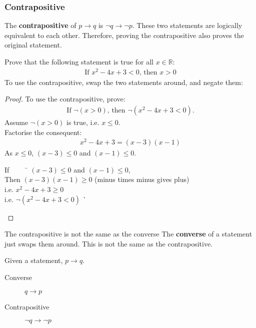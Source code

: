 \documentclass[../notes.tex]{subfiles}
\begin{document}
				\subsubsection{Contrapositive}
					The \textbf{contrapositive} of $p \rightarrow q$ is $\lnot q \rightarrow \lnot p$. These two statements are logically equivalent to each other. Therefore, proving the contrapositive also proves the original statement.
				\begin{example}
					Prove that the following statement is true for all $x \in \mathbb{R}$:
					\begin{align*}
						\text{If } x^{2} - 4x + 3 < 0 \text{, then } x > 0
					\end{align*}
					To use the contrapositive, swap the two statements around, and negate them:
					\begin{proof}
						To use the contrapositive, prove:
						\begin{align*}
							\text{If } \lnot(x > 0) \text{, then } \lnot(x^{2} - 4x + 3 < 0).
						\end{align*}
						Assume $\lnot (x > 0)$ is true, i.e. $x \leq 0$.\\
						Factorise the consequent:
						\begin{align*}
							x^{2} - 4x + 3 = (x - 3)(x - 1)
						\end{align*}
						As $x \leq 0$, $(x - 3) \leq 0$ and $(x - 1) \leq 0$.
						\begin{tabbing}
							If $\qquad$ \= $(x - 3) \leq 0$ and $(x - 1) \leq 0$,\\
							Then \> $(x - 3)(x - 1) \geq 0$ (minus times minus gives plus)\\
							i.e. \> $x^{2} - 4x + 3 \geq 0$\\
							i.e. \> $\lnot (x^{2} - 4x + 3 < 0)$ \` \qedhere
						\end{tabbing}
					\end{proof}
				\end{example}
				\begin{sidenote}{The contrapositive is not the same as the converse}
					The \textbf{converse} of a statement just swaps them around. This is not the same as the contrapositive.
					\begin{example}
						Given a statement, $p \rightarrow q$.
						\begin{description}
							\item[Converse] $q \rightarrow p$
							\item[Contrapositive] $\lnot q \rightarrow \lnot p$ 
						\end{description} 
					\end{example}
				\end{sidenote}
\end{document}
